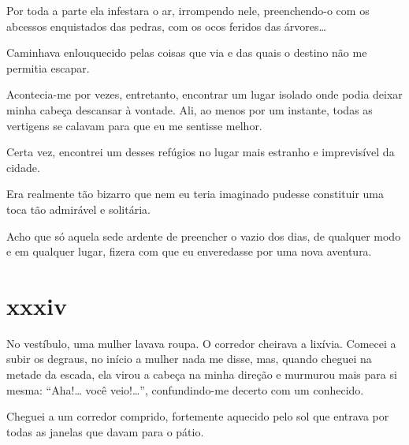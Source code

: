 Por toda a parte ela infestara o ar, irrompendo nele, preenchendo-o com os
abcessos enquistados das pedras, com os ocos feridos das árvores\ldots{}

Caminhava enlouquecido pelas coisas que via e das quais o destino não me
permitia escapar.

Acontecia-me por vezes, entretanto, encontrar um lugar isolado onde podia
deixar minha cabeça descansar à vontade. Ali, ao menos por um instante, todas
as vertigens se calavam para que eu me sentisse melhor.

Certa vez, encontrei um desses refúgios no lugar mais estranho e imprevisível
da cidade.

Era realmente tão bizarro que nem eu teria imaginado pudesse constituir uma
toca tão admirável e solitária.

Acho que só aquela sede ardente de preencher o vazio dos dias, de qualquer
modo e em qualquer lugar, fizera com que eu enveredasse por uma nova
aventura.


\section{xxxiv} 

 

No vestíbulo, uma mulher lavava roupa. O corredor cheirava a lixívia. Comecei
a subir os degraus, no início a mulher nada me disse, mas, quando cheguei na
metade da escada, ela virou a cabeça na minha direção e murmurou mais para si
mesma: ``Aha!\ldots{} você veio!\ldots{}'', confundindo-me decerto com um
conhecido.


Cheguei a um corredor comprido, fortemente aquecido pelo sol que entrava por
todas as janelas que davam para o pátio.

